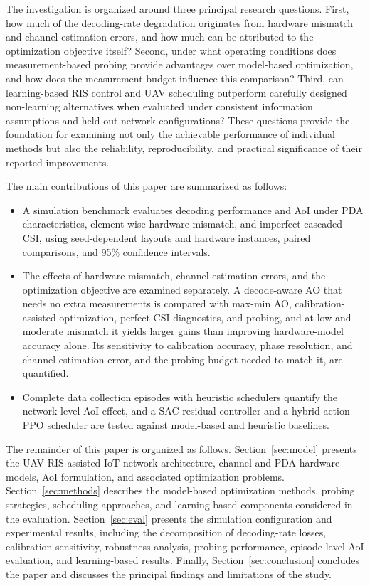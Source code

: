 \documentclass[journal]{IEEEtran}
\begin{document}
The investigation is organized around three principal research questions. First, how much of the decoding-rate degradation originates from hardware mismatch and channel-estimation errors, and how much can be attributed to the optimization objective itself? Second, under what operating conditions does measurement-based probing provide advantages over model-based optimization, and how does the measurement budget influence this comparison? Third, can learning-based RIS control and UAV scheduling outperform carefully designed non-learning alternatives when evaluated under consistent information assumptions and held-out network configurations? These questions provide the foundation for examining not only the achievable performance of individual methods but also the reliability, reproducibility, and practical significance of their reported improvements.

The main contributions of this paper are summarized as follows:
\begin{itemize}
    \item A simulation benchmark evaluates decoding performance and AoI under PDA characteristics, element-wise hardware mismatch, and imperfect cascaded CSI, using seed-dependent layouts and hardware instances, paired comparisons, and 95\% confidence intervals.
    \item The effects of hardware mismatch, channel-estimation errors, and the optimization objective are examined separately. A decode-aware AO that needs no extra measurements is compared with max-min AO, calibration-assisted optimization, perfect-CSI diagnostics, and probing, and at low and moderate mismatch it yields larger gains than improving hardware-model accuracy alone. Its sensitivity to calibration accuracy, phase resolution, and channel-estimation error, and the probing budget needed to match it, are quantified.
    \item Complete data collection episodes with heuristic schedulers quantify the network-level AoI effect, and a SAC residual controller and a hybrid-action PPO scheduler are tested against model-based and heuristic baselines.
\end{itemize}
The remainder of this paper is organized as follows. Section~\ref{sec:model} presents the UAV-RIS-assisted IoT network architecture, channel and PDA hardware models, AoI formulation, and associated optimization problems. Section~\ref{sec:methods} describes the model-based optimization methods, probing strategies, scheduling approaches, and learning-based components considered in the evaluation. Section~\ref{sec:eval} presents the simulation configuration and experimental results, including the decomposition of decoding-rate losses, calibration sensitivity, robustness analysis, probing performance, episode-level AoI evaluation, and learning-based results. Finally, Section~\ref{sec:conclusion} concludes the paper and discusses the principal findings and limitations of the study.
\end{document}

